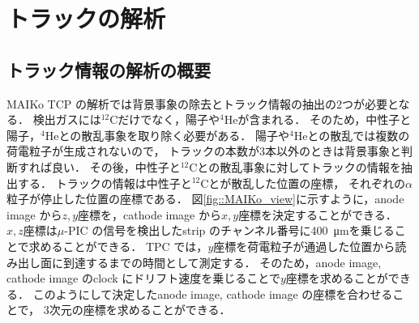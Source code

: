 \documentclass[../master]{subfiles}
\begin{document}
\chapter{トラックの解析}
\section{トラック情報の解析の概要}
MAIKo TCP の解析では背景事象の除去とトラック情報の抽出の2つが必要となる．
検出ガスには${}^{12}\mathrm{C}$だけでなく，陽子や${}^{4}\mathrm{He}$が含まれる．
そのため，中性子と陽子，${}^{4}\mathrm{He}$との散乱事象を取り除く必要がある．
陽子や${}^{4}\mathrm{He}$との散乱では複数の荷電粒子が生成されないので，
トラックの本数が3本以外のときは背景事象と判断すれば良い．
その後，中性子と${}^{12}\mathrm{C}$との散乱事象に対してトラックの情報を抽出する．
トラックの情報は中性子と${}^{12}\mathrm{C}$とが散乱した位置の座標，
それぞれの$\alpha$粒子が停止した位置の座標である．
図\ref{fig::MAIKo_view}に示すように，anode image から$z, y$座標を，cathode image から$x, y$座標を決定することができる．
$x, z$座標は$\mu$-PIC の信号を検出したstrip のチャンネル番号に\SI{400}{\micro\metre}を乗じることで求めることができる．
TPC では，$y$座標を荷電粒子が通過した位置から読み出し面に到達するまでの時間として測定する．
そのため，anode image, cathode image のclock にドリフト速度を乗じることで$y$座標を求めることができる．
このようにして決定したanode image, cathode image の座標を合わせることで，
3次元の座標を求めることができる．
\end{document}
